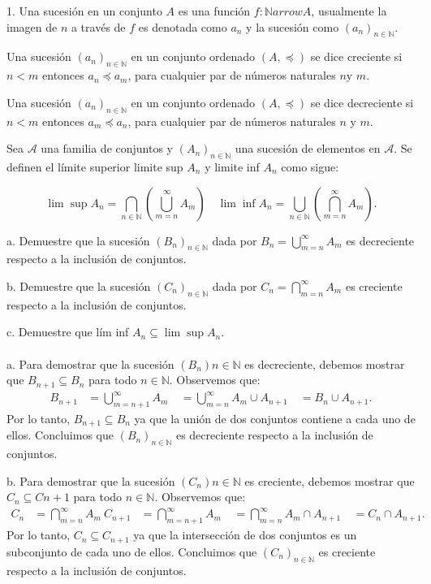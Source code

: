 \documentclass{report}
\begin{document}
    \tableofcontents
    \setlength{\parindent}{0pt}
    \pagebreak

    1. Una sucesión en un conjunto $A$ es una función $f: \mathbb{N} arrow A$, usualmente la imagen de $n$ a través de $f$ es denotada como $a_{n}$ y la sucesión como $(a_{n})_{n \in \mathbb{N}}$.

    Una sucesión $(a_{n})_{n \in \mathbb{N}}$ en un conjunto ordenado $(A, \preceq)$ se dice creciente si $n<m$ entonces $a_{n} \preceq a_{m}$, para cualquier par de números naturales $n \mathrm{y}$ $m$.

    Una sucesión $(a_{n})_{n \in \mathbb{N}}$ en un conjunto ordenado $(A, \preceq)$ se dice decreciente si $n<m$ entonces $a_{m} \preceq a_{n}$, para cualquier par de números naturales $n$ y $m$.

    Sea $\mathcal{A}$ una familia de conjuntos y $(A_{n})_{n \in \mathbb{N}}$ una sucesión de elementos en $\mathcal{A}$. Se definen el límite superior limite sup $A_n$ y limite inf $A_n$ como sigue:

    $$
    \lim \sup A_{n}=\bigcap_{n \in \mathbb{N}}(\bigcup_{m=n}^{\infty} A_{m}) \quad \lim \inf A_{n}=\bigcup_{n \in \mathbb{N}}(\bigcap_{m=n}^{\infty} A_{m}) .
    $$

    a. Demuestre que la sucesión $(B_{n})_{n \in \mathbb{N}}$ dada por $B_{n}=\bigcup_{m=n}^{\infty} A_{m}$ es decreciente respecto a la inclusión de conjuntos.

    b. Demuestre que la sucesión $(C_{n})_{n \in \mathbb{N}}$ dada por $C_{n}=\bigcap_{m=n}^{\infty} A_{m}$ es creciente respecto a la inclusión de conjuntos.

    c. Demuestre que lím inf $A_{n} \subseteq \lim \sup A_{n}$.\\\\
a. Para demostrar que la sucesión $(B_n){n \in \mathbb{N}}$ es decreciente, debemos mostrar que $B_{n+1} \subseteq B_n$ para todo $n \in \mathbb{N}$. Observemos que:
\begin{align*}
B_{n+1} &= \bigcup_{m=n+1}^{\infty} A_m \
&= \bigcup_{m=n}^{\infty} A_m \cup A_{n+1} \
&= B_n \cup A_{n+1}.
\end{align*}
Por lo tanto, $B_{n+1} \subseteq B_n$ ya que la unión de dos conjuntos contiene a cada uno de ellos. Concluimos que $(B_n)_{n \in \mathbb{N}}$ es decreciente respecto a la inclusión de conjuntos.

b. Para demostrar que la sucesión $(C_n){n \in \mathbb{N}}$ es creciente, debemos mostrar que $C_n \subseteq C{n+1}$ para todo $n \in \mathbb{N}$. Observemos que:
    \begin{align*}
    C_n &= \bigcap_{m=n}^{\infty} A_m \
    C_{n+1} &= \bigcap_{m=n+1}^{\infty} A_m \
    &= \bigcap_{m=n}^{\infty} A_m \cap A_{n+1} \
    &= C_n \cap A_{n+1}.
    \end{align*}
    Por lo tanto, $C_n \subseteq C_{n+1}$ ya que la intersección de dos conjuntos es un subconjunto de cada uno de ellos. Concluimos que $(C_n)_{n \in \mathbb{N}}$ es creciente respecto a la inclusión de conjuntos.
\end{document}
